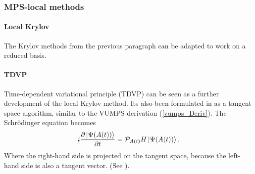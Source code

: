 \subsubsection{MPS-local methods}

\paragraph{Local Krylov}
The Krylov methods from the previous paragraph can be adapted to work on a reduced basis.

\paragraph{TDVP} Time-dependent variational principle (TDVP) can be seen as a further development of the local Krylov method. Its also been formulated in as a tangent space algorithm, similar to the \Gls{VUMPS} derivation (\cref{vumps_Deriv}). The Schrödinger equation becomes
\begin{equation}
  i \frac{\partial \ket{ \Psi( A(t) ) }}{\partial t} = \mathcal{P}_{ A ( t) }  H  \ket{ \Psi( A (t) ) } .
\end{equation}
Where the right-hand side is projected on the tangent space, because the left-hand side is also a tangent vector. (See \cite{Vanderstraeten2019}).

